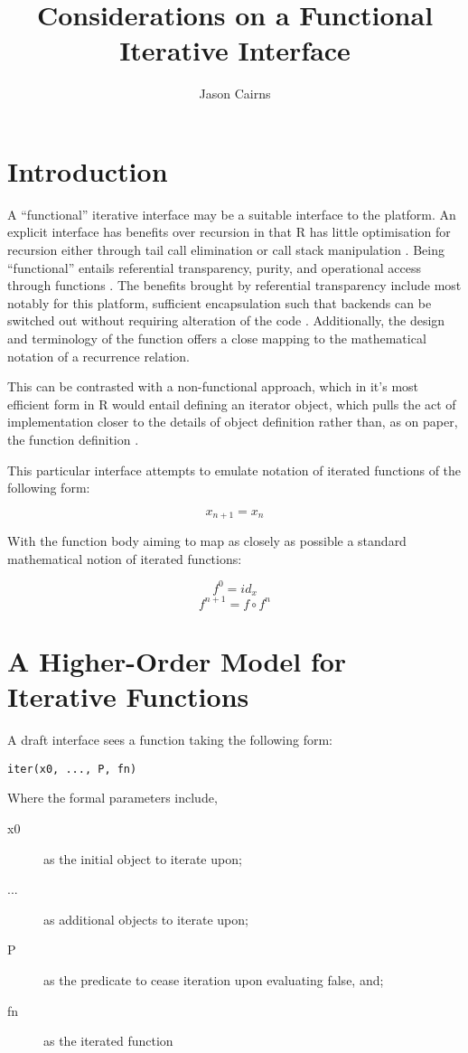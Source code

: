 \documentclass[a4paper,10pt]{article}
\begin{document}
\title{Considerations on a Functional Iterative Interface}
\author{Jason Cairns}
  
\maketitle

\section{Introduction}
A ``functional'' iterative interface may be a suitable interface to the
platform.
An explicit interface has benefits over recursion in that R has little
optimisation for recursion either through tail call elimination or call stack
manipulation \cite{rcore2020lang}.
Being ``functional'' entails referential transparency, purity, and operational
access through functions \cite{cousineau1998functional}.
The benefits brought by referential transparency include most notably for this
platform, sufficient encapsulation such that backends can be switched out
without requiring alteration of the code \cite{strachey2000fundamental}.
Additionally, the design and terminology of the function offers a close mapping
to the mathematical notation of a recurrence relation.

This can be contrasted with a non-functional approach, which in it's most
efficient form in R would entail defining an iterator object, which pulls the
act of implementation closer to the details of object definition rather than,
as on paper, the function definition \cite{analytics19}.

This particular interface attempts to emulate notation of iterated functions of
the following form:

\[x_{n+1} = x_n\]

With the function body aiming to map as closely as possible a standard
mathematical notion of iterated functions:

\[f^0 = id_x\]
\[f^{n+1} = f \circ f^n\]

\section{A Higher-Order Model for Iterative Functions}

A draft interface sees a function taking the following form:

\texttt{iter(x0, ..., P, fn)}

Where the formal parameters include,

\begin{description}
	\item[x0] as the initial object to iterate upon; 
	\item[...] as additional objects to iterate upon;
	\item[P] as the predicate to cease iteration upon evaluating false, and;
	\item[fn] as the iterated function
\end{description}
\end{document}
